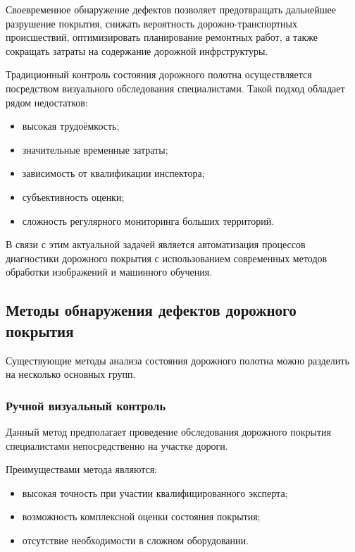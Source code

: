 Своевременное обнаружение дефектов позволяет предотвращать дальнейшее разрушение покрытия, снижать вероятность дорожно-транспортных происшествий, оптимизировать планирование ремонтных работ, а также сокращать затраты на содержание дорожной инфрструктуры.

Традиционный контроль состояния дорожного полотна осуществляется посредством визуального обследования специалистами. Такой подход обладает рядом недостатков:

\begin{itemize}
	\item высокая трудоёмкость;
	\item значительные временные затраты;
	\item зависимость от квалификации инспектора;
	\item субъективность оценки;
	\item сложность регулярного мониторинга больших территорий.
\end{itemize}

В связи с этим актуальной задачей является автоматизация процессов диагностики дорожного покрытия с использованием современных методов обработки изображений и машинного обучения.

\subsection{Методы обнаружения дефектов дорожного покрытия}

Существующие методы анализа состояния дорожного полотна можно разделить на несколько основных групп.

\subsubsection{Ручной визуальный контроль}

Данный метод предполагает проведение обследования дорожного покрытия специалистами непосредственно на участке дороги.

Преимуществами метода являются:

\begin{itemize}
	\item высокая точность при участии квалифицированного эксперта;
	\item возможность комплексной оценки состояния покрытия;
	\item отсутствие необходимости в сложном оборудовании.
\end{itemize}

